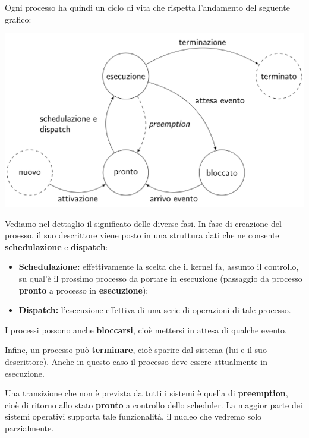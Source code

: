 \documentclass[a4paper,11pt]{article}
\begin{document}
\noindent
\begin{minipage}{\textwidth}
Ogni processo ha quindi un ciclo di vita che rispetta l'andamento del seguente grafico:
\begin{center}
	\includegraphics[scale=0.34]{../figures/schema_proc.png}
\end{center}
\end{minipage}

\par\bigskip

Vediamo nel dettaglio il significato delle diverse fasi.
In fase di creazione del proesso, il suo descrittore viene posto in una struttura dati che ne consente \textbf{schedulazione} e \textbf{dispatch}:
\begin{itemize}
	\item \textbf{Schedulazione:} effettivamente la scelta che il kernel fa, assunto il controllo, su qual'è il prossimo processo da portare in esecuzione (passaggio da processo \textbf{pronto} a processo in \textbf{esecuzione});
	\item \textbf{Dispatch:} l'esecuzione effettiva di una serie di operazioni di tale processo. 
\end{itemize}

I processi possono anche \textbf{bloccarsi}, cioè mettersi in attesa di qualche evento. 

Infine, un processo può \textbf{terminare}, cioè sparire dal sistema (lui e il suo descrittore).
Anche in questo caso il processo deve essere attualmente in esecuzione.

Una transizione che non è prevista da tutti i sistemi è quella di \textbf{preemption}, cioè di ritorno allo stato \textbf{pronto} a controllo dello scheduler.
La maggior parte dei sistemi operativi supporta tale funzionalità, il nucleo che vedremo solo parzialmente.
\end{document}
